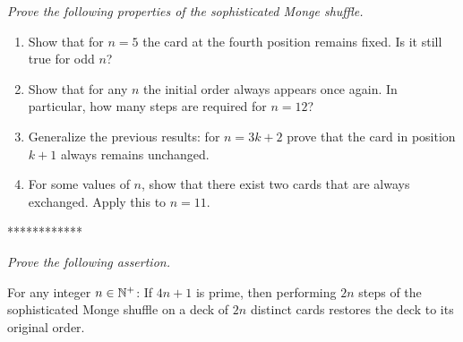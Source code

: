 \begin{enumerate}
\begin{enumerate}
{\medskip

{\em Prove the following properties of the sophisticated Monge shuffle.} 

\begin{enumerate}
\item Show that for $n=5$ the card at the fourth position remains fixed.
Is it still true for odd $n$?
\item Show that for any $n$ the initial order always appears once again.
In particular, how many steps are required for $n=12$?
\item Generalize the previous results:
for $n=3k+2$ prove that the card in position $k+1$ always remains unchanged.
\item For some values of $n$, show that there exist two cards that are always exchanged. Apply this to $n=11$.
\end{enumerate}
************}

\medskip

{\em Prove the following assertion.}

\begin{prop}
For any integer $n \in \mathbb{N}^+$: 
If $4n+1$ is prime, then performing $2n$ steps of the sophisticated Monge shuffle on a deck of $2n$ distinct cards restores the deck to its original order.
\end{prop}
  \end{enumerate}

\end{enumerate}

